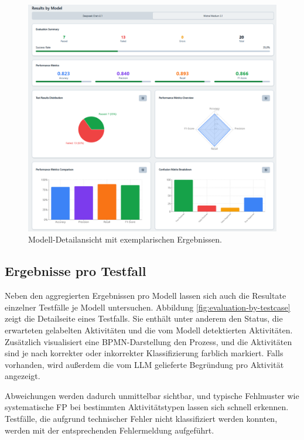 \begin{figure}
    \centering
    \includegraphics[height=.55\textheight]{images/evaluation/evaluation-result-by-model}
    \caption{Modell-Detailansicht mit exemplarischen Ergebnissen.}
    \label{fig:evaluation-by-model}
\end{figure}

\subsection*{Ergebnisse pro Testfall}

Neben den aggregierten Ergebnissen pro Modell lassen sich auch die Resultate einzelner Testfälle je Modell untersuchen. Abbildung \ref{fig:evaluation-by-testcase} zeigt die Detailseite eines Testfalls. Sie enthält unter anderem den Status, die erwarteten gelabelten Aktivitäten und die vom Modell detektierten Aktivitäten. Zusätzlich visualisiert eine \ac{BPMN}-Darstellung den Prozess, und die Aktivitäten sind je nach korrekter oder inkorrekter Klassifizierung farblich markiert. Falls vorhanden, wird außerdem die vom  \ac{LLM} gelieferte Begründung pro Aktivität angezeigt.

Abweichungen werden dadurch unmittelbar sichtbar, und typische Fehlmuster wie systematische \ac{FP} bei bestimmten Aktivitätstypen lassen sich schnell erkennen. Testfälle, die aufgrund technischer Fehler nicht klassifiziert werden konnten, werden mit der entsprechenden Fehlermeldung aufgeführt.

